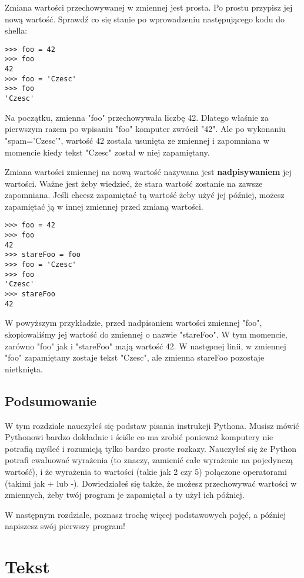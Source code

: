\documentclass{book}
\begin{document}
Zmiana wartości przechowywanej w zmiennej jest prosta. Po prostu przypisz jej nową wartość. Sprawdź co się stanie po wprowadzeniu następującego kodu do shella:

\begin{lstlisting}
>>> foo = 42
>>> foo
42
>>> foo = 'Czesc'
>>> foo
'Czesc'
\end{lstlisting}

Na początku, zmienna "foo" przechowywała liczbę 42. Dlatego właśnie za pierwszym razem po wpisaniu "foo" komputer zwrócił "42". Ale po wykonaniu "spam='Czesc'", wartość 42 została usunięta ze zmiennej i zapomniana w momencie kiedy tekst "Czesc" został w niej zapamiętany.

Zmiana wartości zmiennej na nową wartość nazywana jest {\bf nadpisywaniem} jej wartości. Ważne jest żeby wiedzieć, że stara wartość zostanie na zawsze zapomniana. Jeśli chcesz zapamiętać tą wartość żeby użyć jej później, możesz zapamiętać ją w innej zmiennej przed zmianą wartości.

\begin{lstlisting}
>>> foo = 42
>>> foo
42
>>> stareFoo = foo
>>> foo = 'Czesc'
>>> foo
'Czesc'
>>> stareFoo
42
\end{lstlisting}

W powyższym przykładzie, przed nadpisaniem wartości zmiennej "foo", skopiowaliśmy jej wartość do zmiennej o nazwie "stareFoo". W tym momencie, zarówno "foo" jak i "stareFoo" mają wartość 42. W następnej linii, w zmiennej "foo" zapamiętany zostaje tekst "Czesc", ale zmienna stareFoo pozostaje nietknięta.

\section{Podsumowanie}

W tym rozdziale nauczyłeś się podstaw pisania instrukcji Pythona. Musisz mówić Pythonowi bardzo dokładnie i ściśle co ma zrobić ponieważ komputery nie potrafią myśleć i rozumieją tylko bardzo proste rozkazy. Nauczyłeś się że Python potrafi ewaluować wyrażenia (to znaczy, zamienić całe wyrażenie na pojedynczą wartość), i że wyrażenia to wartości (takie jak 2 czy 5) połączone operatorami (takimi jak + lub -). Dowiedziałeś się także, że możesz przechowywać wartości w zmiennych, żeby twój program je zapamiętał a ty użył ich później.

W następnym rozdziale, poznasz trochę więcej podstawowych pojęć, a później napiszesz swój pierwszy program!

\chapter{Tekst}
\end{document}
